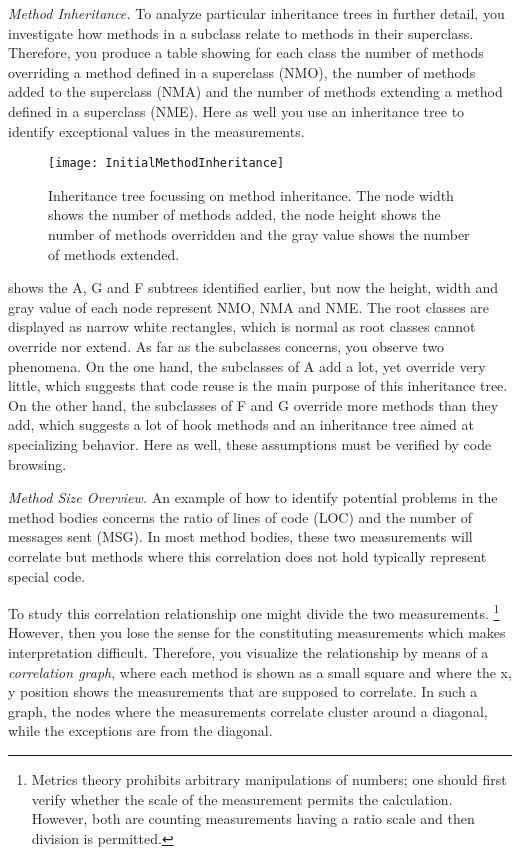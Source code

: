 \documentclass[a4paper,10pt,twoside]{book}
\begin{document}
\noindent
\emph{Method Inheritance.}
To analyze particular inheritance trees in further detail, you investigate how methods in a 
subclass relate to methods in their superclass. Therefore, you produce a table showing for 
each class the number of methods overriding a method defined in a superclass (NMO), the 
number of methods added to the superclass (NMA) and the number of methods extending a 
method defined in a superclass (NME). Here as well you use an inheritance tree to identify 
exceptional values in the measurements.

\begin{figure}
\begin{center}
\texttt{[image: InitialMethodInheritance]}
\caption{Inheritance tree focussing on method inheritance. The node width shows the number 
of methods added, the node height shows the number of methods overridden and the gray value 
shows the number of methods extended.}
\end{center}
\end{figure}

 shows the A, G and F subtrees identified earlier, but now 
the height, width and gray value of each node represent NMO, NMA and NME. The root classes 
are displayed as narrow white rectangles, which is normal as root classes cannot override 
nor extend. As far as the subclasses concerns, you observe two phenomena. On the one hand, 
the subclasses of A add a lot, yet override very little, which suggests that code reuse is 
the main purpose of this inheritance tree. On the other hand, the subclasses of F and G 
override more methods than they add, which suggests a lot of hook methods and an 
inheritance tree aimed at specializing behavior. Here as well, these assumptions must be 
verified by code browsing. 

\noindent
\emph{Method Size Overview.}
An example of how to identify potential problems in the method bodies concerns the ratio of 
lines of code (LOC) and the number of messages sent (MSG). In most method bodies, these two 
measurements will correlate but methods where this correlation does not hold typically 
represent special code.

To study this correlation relationship one might divide the two measurements.
\footnote{Metrics theory prohibits arbitrary manipulations of numbers; one should first 
verify whether the scale of the measurement permits the calculation\cite{Fent96a}. 
However, both are counting measurements having a ratio scale and then division is 
permitted.} However, then you lose the sense for the constituting measurements which makes 
interpretation difficult. Therefore, you visualize the relationship by means of a 
\emph{correlation graph}, where each method is shown as a small square and where the x, y 
position shows the measurements that are supposed to correlate. In such a graph, the nodes 
where the measurements correlate cluster around a diagonal, while the exceptions are from 
the diagonal.
\end{document}

